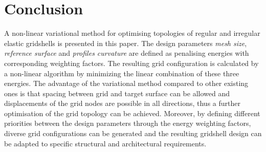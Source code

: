
\section{Conclusion}

A non-linear variational method for optimising topologies of regular and irregular elastic gridshells is presented in this paper. The design parameters {\it mesh size}, {\it reference surface} and {\it profiles curvature} are defined as penalising energies with corresponding weighting factors. The resulting grid configuration is calculated by a non-linear algorithm by minimizing the linear combination of these three energies. The advantage of the variational method compared to other existing ones is that spacing between grid and target surface can be allowed and displacements of the grid nodes are possible in all directions, thus a further optimisation of the grid topology can be achieved. Moreover, by defining different priorities between the design parameters through the energy weighting factors, diverse grid configurations can be generated and the resulting gridshell design can be adapted to specific structural and architectural requirements. 

